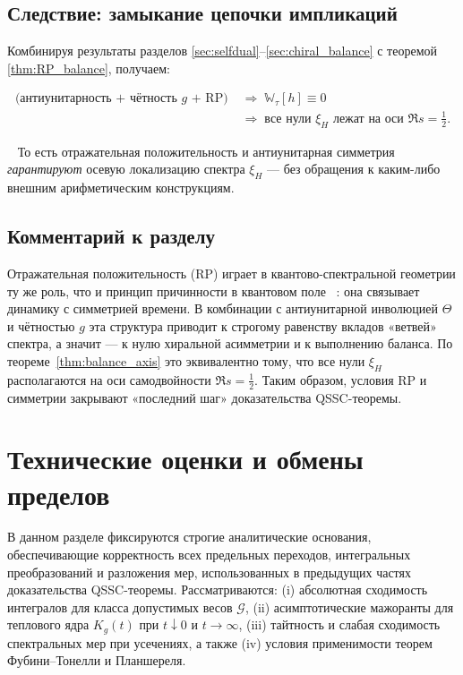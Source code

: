 \documentclass{article}
\numberwithin{equation}{section}
\theoremstyle{plain}
\theoremstyle{definition}
\theoremstyle{remark}
\def\infty{∞}\def\partial{∂}\def\sum{Σ}\def\int{∫}%
\begin{document}
\subsection{Следствие: замыкание цепочки импликаций}
\label{subsec:final_implication}

Комбинируя результаты разделов \ref{sec:selfdual}–\ref{sec:chiral_balance} с теоремой \ref{thm:RP_balance}, получаем:

\begin{equation}
	\label{eq:implication_chain}
	\begin{aligned}
		\text{(антиунитарность + чётность $g$ + RP)} 
		&\;\Longrightarrow\;
		\mathbb W_\tau[h]\equiv 0
		\\
		&\;\Longrightarrow\;
		\text{все нули }\xi_H\text{ лежат на оси }\Re s=\tfrac12.
	\end{aligned}
\end{equation}

~\cite{Schrodinger1940}
То есть отражательная положительность и антиунитарная симметрия \emph{гарантируют}
осевую локализацию спектра $\xi_H$ --- без обращения к каким-либо внешним арифметическим конструкциям.

\subsection{Комментарий к разделу}
\label{subsec:summary8}

Отражательная положительность (RP) играет в квантово-спектральной геометрии ту же роль,
что и принцип причинности в квантовом поле ~\cite{Haag1992}: она связывает динамику с симметрией времени.
В комбинации с антиунитарной инволюцией $\Theta$ и чётностью $g$
эта структура приводит к строгому равенству вкладов «ветвей» спектра,  
а значит --- к нулю хиральной асимметрии и к выполнению баланса.  
По теореме~\ref{thm:balance_axis} это эквивалентно тому, что все нули $\xi_H$
располагаются на оси самодвойности $\Re s=\tfrac12$.
Таким образом, условия RP и симметрии закрывают «последний шаг» доказательства QSSC-теоремы.

\clearpage

\section{Технические оценки и обмены пределов}
\label{sec:tech_estimates}

\noindent
В данном разделе фиксируются строгие аналитические основания, обеспечивающие корректность
всех предельных переходов, интегральных преобразований и разложения мер,
использованных в предыдущих частях доказательства QSSC-теоремы.
Рассматриваются: (i) абсолютная сходимость интегралов для класса допустимых весов $\mathcal G$,
(ii) асимптотические мажоранты для теплового ядра $K_g(t)$ при $t\downarrow 0$ и $t\to\infty$,
(iii) тайтность и слабая сходимость спектральных мер при усечениях, а также
(iv) условия применимости теорем Фубини–Тонелли и Планшереля.
\end{document}
